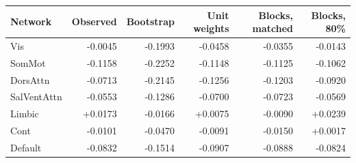 \begin{tabular}{lrrrrr}
\toprule
Network & Observed & Bootstrap & Unit weights & Blocks, matched & Blocks, 80\% \\
\midrule
Vis & -0.0045 & -0.1993 & -0.0458 & -0.0355 & -0.0143 \\
SomMot & -0.1158 & -0.2252 & -0.1148 & -0.1125 & -0.1062 \\
DorsAttn & -0.0713 & -0.2145 & -0.1256 & -0.1203 & -0.0920 \\
SalVentAttn & -0.0553 & -0.1286 & -0.0700 & -0.0723 & -0.0569 \\
Limbic & +0.0173 & -0.0166 & +0.0075 & -0.0090 & +0.0239 \\
Cont & -0.0101 & -0.0470 & -0.0091 & -0.0150 & +0.0017 \\
Default & -0.0832 & -0.1514 & -0.0907 & -0.0888 & -0.0824 \\
\bottomrule
\end{tabular}
